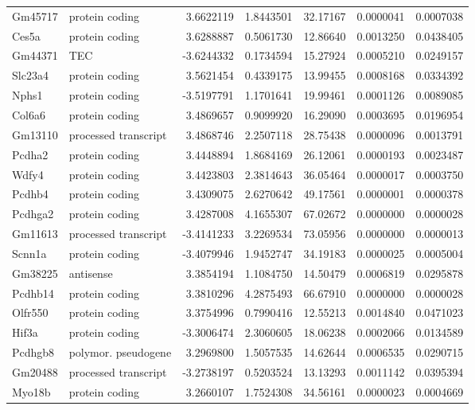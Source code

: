 \documentclass[onehalf,12pt]{beavtex}
\begin{document}
\begin{longtable}{llrrrrr}
  \addlinespace
  Gm45717 & protein coding & 3.6622119 & 1.8443501 & 32.17167 & 0.0000041 & 0.0007038\\
  Ces5a & protein coding & 3.6288887 & 0.5061730 & 12.86640 & 0.0013250 & 0.0438405\\
  Gm44371 & TEC & -3.6244332 & 0.1734594 & 15.27924 & 0.0005210 & 0.0249157\\
  Slc23a4 & protein coding & 3.5621454 & 0.4339175 & 13.99455 & 0.0008168 & 0.0334392\\
  Nphs1 & protein coding & -3.5197791 & 1.1701641 & 19.99461 & 0.0001126 & 0.0089085\\
  \addlinespace
  Col6a6 & protein coding & 3.4869657 & 0.9099920 & 16.29090 & 0.0003695 & 0.0196954\\
  Gm13110 & processed transcript & 3.4868746 & 2.2507118 & 28.75438 & 0.0000096 & 0.0013791\\
  Pcdha2 & protein coding & 3.4448894 & 1.8684169 & 26.12061 & 0.0000193 & 0.0023487\\
  Wdfy4 & protein coding & 3.4423803 & 2.3814643 & 36.05464 & 0.0000017 & 0.0003750\\
  Pcdhb4 & protein coding & 3.4309075 & 2.6270642 & 49.17561 & 0.0000001 & 0.0000378\\
  \addlinespace
  Pcdhga2 & protein coding & 3.4287008 & 4.1655307 & 67.02672 & 0.0000000 & 0.0000028\\
  Gm11613 & processed transcript & -3.4141233 & 3.2269534 & 73.05956 & 0.0000000 & 0.0000013\\
  Scnn1a & protein coding & -3.4079946 & 1.9452747 & 34.19183 & 0.0000025 & 0.0005004\\
  Gm38225 & antisense & 3.3854194 & 1.1084750 & 14.50479 & 0.0006819 & 0.0295878\\
  Pcdhb14 & protein coding & 3.3810296 & 4.2875493 & 66.67910 & 0.0000000 & 0.0000028\\
  \addlinespace
  Olfr550 & protein coding & 3.3754996 & 0.7990416 & 12.55213 & 0.0014840 & 0.0471023\\
  Hif3a & protein coding & -3.3006474 & 2.3060605 & 18.06238 & 0.0002066 & 0.0134589\\
  Pcdhgb8 & polymor. pseudogene & 3.2969800 & 1.5057535 & 14.62644 & 0.0006535 & 0.0290715\\
  Gm20488 & processed transcript & -3.2738197 & 0.5203524 & 13.13293 & 0.0011142 & 0.0395394\\
  Myo18b & protein coding & 3.2660107 & 1.7524308 & 34.56161 & 0.0000023 & 0.0004669\\

\end{longtable}
\end{document}
